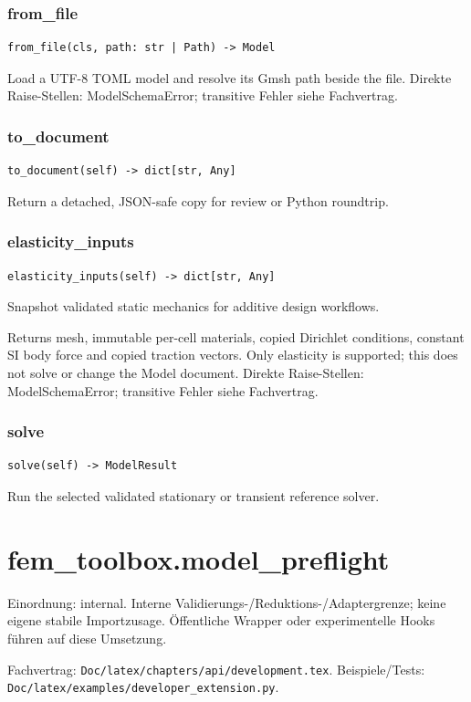 \subsubsection*{from\_file}
\begin{lstlisting}
from_file(cls, path: str | Path) -> Model
\end{lstlisting}
Load a UTF-8 TOML model and resolve its Gmsh path beside the file.
Direkte Raise-Stellen: ModelSchemaError; transitive Fehler siehe Fachvertrag.
\subsubsection*{to\_document}
\begin{lstlisting}
to_document(self) -> dict[str, Any]
\end{lstlisting}
Return a detached, JSON-safe copy for review or Python roundtrip.
\subsubsection*{elasticity\_inputs}
\begin{lstlisting}
elasticity_inputs(self) -> dict[str, Any]
\end{lstlisting}
Snapshot validated static mechanics for additive design workflows.\par Returns mesh, immutable per-cell materials, copied Dirichlet conditions, constant SI body force and copied traction vectors. Only elasticity is supported; this does not solve or change the Model document.
Direkte Raise-Stellen: ModelSchemaError; transitive Fehler siehe Fachvertrag.
\subsubsection*{solve}
\begin{lstlisting}
solve(self) -> ModelResult
\end{lstlisting}
Run the selected validated stationary or transient reference solver.
\section{fem\_toolbox.model\_preflight}
Einordnung: internal. Interne Validierungs-/Reduktions-/Adaptergrenze; keine eigene stabile Importzusage. Öffentliche Wrapper oder experimentelle Hooks führen auf diese Umsetzung.
\par Fachvertrag: \nolinkurl{Doc/latex/chapters/api/development.tex}. Beispiele/Tests:
\nolinkurl{Doc/latex/examples/developer_extension.py}.
